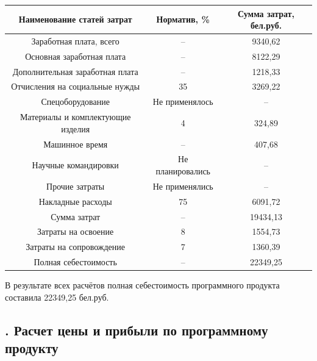 {{\begin{Center}
			\begin{tabular}{|c|c|c|}
				\hline
				Наименование статей затрат & Норматив, \% & Сумма затрат, бел.руб. \\ \hline
				Заработная плата, всего & {--} & 9340,62\\ \hline
				Основная заработная плата & {--} & 8122,29\\ \hline
				Дополнительная заработная плата & {--} & 1218,33\\ \hline
				Отчисления на социальные нужды & 35 & 3269,22\\ \hline
				Спецоборудование & Не применялось & {--} \\ \hline
				Материалы и комплектующие изделия & 4 & 324,89\\ \hline
				Машинное время & {--} & 407,68\\ \hline
				Научные командировки & Не планировались & {--} \\ \hline
				Прочие затраты & Не применялись & {--} \\ \hline
				Накладные расходы & 75 & 6091,72\\ \hline
				Сумма затрат & {--} & 19434,13\\ \hline
				Затраты на освоение & 8 & 1554,73\\ \hline
				Затраты на сопровождение & 7 & 1360,39\\ \hline
				Полная себестоимость & {--} & 22349,25\\ \hline
	\end{tabular} \end{Center}} \addtocounter{tablecntr}{1} 
	\botTablespace
	
	\par \redline В результате всех расчётов полная себестоимость программного продукта составила 22349,25 бел.руб. 
}


\subtitlespace

\subsection*{ 
	\gostTitleFont
	\redline
	\thechaptercntr .\thesubchaptercntr \spc
	Расчет цены и прибыли по программному продукту
} \addtocounter{subchaptercntr}{1}

\subtitlespace

